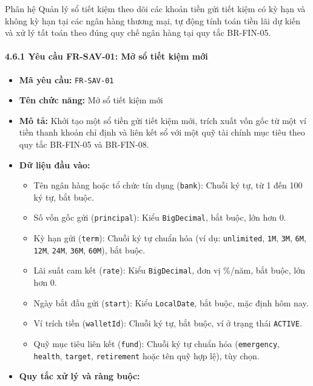 \documentclass[11pt,a4paper]{article}
\providecommand{\tightlist}{
  \setlength{\itemsep}{0pt}\setlength{\parskip}{0pt}}
\begin{document}
Phân hệ Quản lý sổ tiết kiệm theo dõi các khoản tiền gửi tiết kiệm có kỳ
hạn và không kỳ hạn tại các ngân hàng thương mại, tự động tính toán tiền
lãi dự kiến và xử lý tất toán theo đúng quy chế ngân hàng tại quy tắc
BR-FIN-05.

\paragraph{4.6.1 Yêu cầu FR-SAV-01: Mở sổ tiết kiệm
mới}\label{461-yuxeau-cux1ea7u-fr-sav-01-mux1edf-sux1ed5-tiux1ebft-kiux1ec7m-mux1edbi}

\begin{itemize}
\tightlist
\item
  \textbf{Mã yêu cầu:} \texttt{FR-SAV-01}
\item
  \textbf{Tên chức năng:} Mở sổ tiết kiệm mới
\item
  \textbf{Mô tả:} Khởi tạo một sổ tiền gửi tiết kiệm mới, trích xuất vốn
  gốc từ một ví tiền thanh khoản chỉ định và liên kết sổ với một quỹ tài
  chính mục tiêu theo quy tắc BR-FIN-05 và BR-FIN-08.
\item
  \textbf{Dữ liệu đầu vào:}

  \begin{itemize}
  \tightlist
  \item
    Tên ngân hàng hoặc tổ chức tín dụng (\texttt{bank}): Chuỗi ký tự, từ
    1 đến 100 ký tự, bắt buộc.
  \item
    Số vốn gốc gửi (\texttt{principal}): Kiểu \texttt{BigDecimal}, bắt
    buộc, lớn hơn 0.
  \item
    Kỳ hạn gửi (\texttt{term}): Chuỗi ký tự chuẩn hóa (ví dụ:
    \texttt{unlimited}, \texttt{1M}, \texttt{3M}, \texttt{6M},
    \texttt{12M}, \texttt{24M}, \texttt{36M}, \texttt{60M}), bắt buộc.
  \item
    Lãi suất cam kết (\texttt{rate}): Kiểu \texttt{BigDecimal}, đơn vị
    \%/năm, bắt buộc, lớn hơn 0.
  \item
    Ngày bắt đầu gửi (\texttt{start}): Kiểu \texttt{LocalDate}, bắt
    buộc, mặc định hôm nay.
  \item
    Ví trích tiền (\texttt{walletId}): Chuỗi ký tự, bắt buộc, ví ở trạng
    thái \texttt{ACTIVE}.
  \item
    Quỹ mục tiêu liên kết (\texttt{fund}): Chuỗi ký tự chuẩn hóa
    (\texttt{emergency}, \texttt{health}, \texttt{target},
    \texttt{retirement} hoặc tên quỹ hợp lệ), tùy chọn.
  \end{itemize}
\item
  \textbf{Quy tắc xử lý và ràng buộc:}


\end{itemize}
\end{document}
